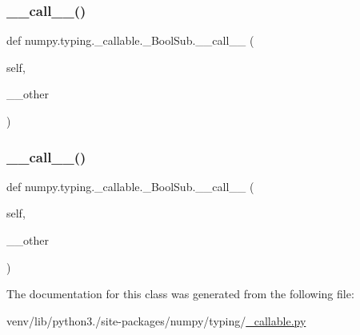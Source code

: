 \subsubsection{\texorpdfstring{\+\_\+\+\_\+call\+\_\+\+\_\+()}{\_\_call\_\_()}\hspace{0.1cm}{\footnotesize\ttfamily [4/5]}}
{\footnotesize\ttfamily def numpy.\+typing.\+\_\+callable.\+\_\+\+Bool\+Sub.\+\_\+\+\_\+call\+\_\+\+\_\+ (\begin{DoxyParamCaption}\item[{}]{self,  }\item[{}]{\+\_\+\+\_\+other }\end{DoxyParamCaption})}

\mbox{\label{classnumpy_1_1typing_1_1__callable_1_1__BoolSub_a2fc15a4cf347f91dfb290f5e6dfa5cfb}} 
\subsubsection{\texorpdfstring{\+\_\+\+\_\+call\+\_\+\+\_\+()}{\_\_call\_\_()}\hspace{0.1cm}{\footnotesize\ttfamily [5/5]}}
{\footnotesize\ttfamily def numpy.\+typing.\+\_\+callable.\+\_\+\+Bool\+Sub.\+\_\+\+\_\+call\+\_\+\+\_\+ (\begin{DoxyParamCaption}\item[{}]{self,  }\item[{}]{\+\_\+\+\_\+other }\end{DoxyParamCaption})}



The documentation for this class was generated from the following file\+:\begin{DoxyCompactItemize}
\item 
venv/lib/python3./site-\/packages/numpy/typing/\hyperlink{__callable_8py}{\+\_\+callable.\+py}\end{DoxyCompactItemize}
